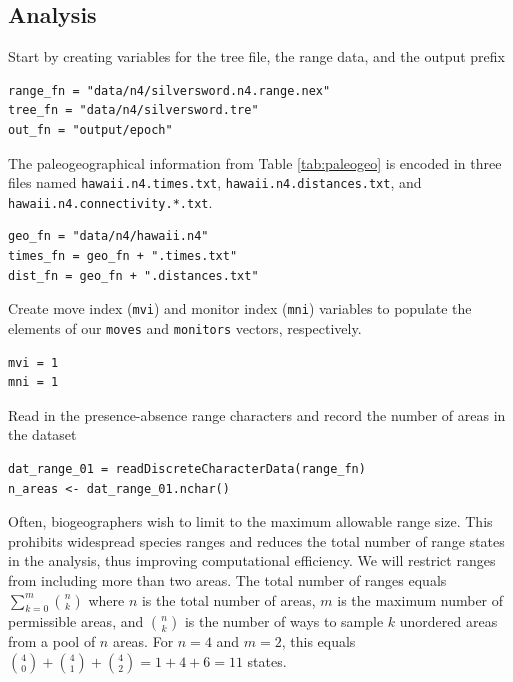 \subsection{Analysis}

Start by creating variables for the tree file, the range data, and the output prefix

\begin{snugshade}
\begin{lstlisting}
range_fn = "data/n4/silversword.n4.range.nex"
tree_fn = "data/n4/silversword.tre"
out_fn = "output/epoch"
\end{lstlisting}
\end{snugshade}

The paleogeographical information from Table \ref{tab:paleogeo} is encoded in three files named {\tt hawaii.n4.times.txt}, {\tt hawaii.n4.distances.txt}, and {\tt hawaii.n4.connectivity.*.txt}.

\begin{snugshade}
\begin{lstlisting}
geo_fn = "data/n4/hawaii.n4"
times_fn = geo_fn + ".times.txt"
dist_fn = geo_fn + ".distances.txt"
\end{lstlisting}
\end{snugshade}

Create move index ({\tt mvi}) and monitor index ({\tt mni}) variables to populate the elements of our {\tt moves} and {\tt monitors} vectors, respectively.

\begin{snugshade}
\begin{lstlisting}
mvi = 1
mni = 1
\end{lstlisting}
\end{snugshade}


Read in the presence-absence range characters and record the number of areas in the dataset

\begin{snugshade}
\begin{lstlisting}
dat_range_01 = readDiscreteCharacterData(range_fn)
n_areas <- dat_range_01.nchar()
\end{lstlisting}
\end{snugshade}

Often, biogeographers wish to limit to the maximum allowable range size.
This prohibits widespread species ranges and reduces the total number of range states in the analysis, thus improving computational efficiency.
We will restrict ranges from including more than two areas.
The total number of ranges equals $\sum_{k=0}^m {{n}\choose{k}}$ where $n$ is the total number of areas, $m$ is the maximum number of permissible areas, and ${{n}\choose{k}}$ is the number of ways to sample $k$ unordered areas from a pool of $n$ areas.
For $n=4$ and $m=2$, this equals ${{4}\choose{0}} + {{4}\choose{1}} + {{4}\choose{2}} = 1 + 4 + 6 = 11$ states.

